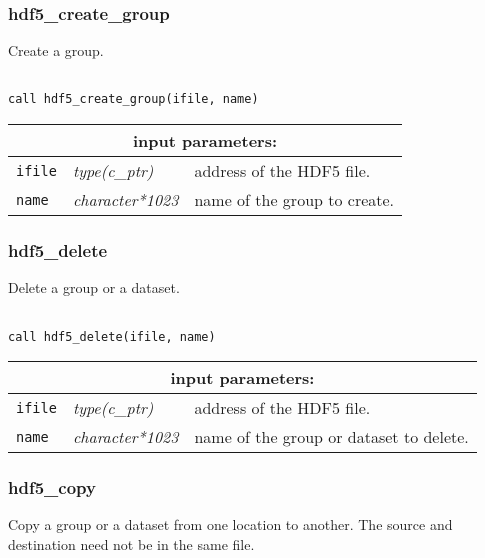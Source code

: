 \subsubsection{hdf5\_create\_group}

Create a group.

\begin{verbatim}

call hdf5_create_group(ifile, name)
\end{verbatim}

\noindent
\begin{tabular}{|p{1.5cm}|p{3cm}|p{10cm}|}
\hline
\multicolumn{3}{|c|}{\bf input parameters:} \\
\hline
{\tt ifile} & {\it type(c\_ptr)} & address of the HDF5 file. \\
\hline
{\tt name} & {\it character*1023} & name of the group to create. \\
\hline
\end{tabular}

\vskip 0.8cm

\subsubsection{hdf5\_delete}

Delete a group or a dataset.

\begin{verbatim}

call hdf5_delete(ifile, name)
\end{verbatim}

\noindent
\begin{tabular}{|p{1.5cm}|p{3cm}|p{10cm}|}
\hline
\multicolumn{3}{|c|}{\bf input parameters:} \\
\hline
{\tt ifile} & {\it type(c\_ptr)} & address of the HDF5 file. \\
\hline
{\tt name} & {\it character*1023} & name of the group or dataset to delete. \\
\hline
\end{tabular}

\vskip 0.8cm

\subsubsection{hdf5\_copy}

Copy a group or a dataset from one location to another. The source and destination need not be in the same file.

